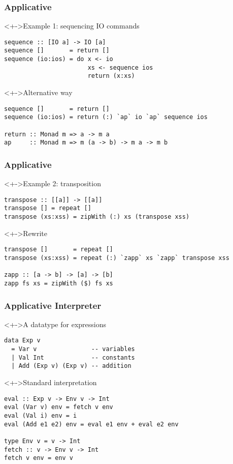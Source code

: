 \documentclass{beamer}
\begin{document}
\begin{frame}[fragile]
  \frametitle{Applicative}
  \begin{alertblock}<+->{Example 1: sequencing IO commands}
\begin{lstlisting}
sequence :: [IO a] -> IO [a]
sequence []       = return []
sequence (io:ios) = do x <- io
                       xs <- sequence ios
                       return (x:xs)
\end{lstlisting}  
  \end{alertblock}
  \begin{alertblock}<+->{Alternative way}
\begin{lstlisting}
sequence []       = return []
sequence (io:ios) = return (:) `ap` io `ap` sequence ios

return :: Monad m => a -> m a
ap     :: Monad m => m (a -> b) -> m a -> m b
\end{lstlisting}
  \end{alertblock}
\end{frame}

\begin{frame}[fragile]
 \frametitle{Applicative}
 \begin{exampleblock}<+->{Example 2: transposition}
\begin{lstlisting}
transpose :: [[a]] -> [[a]]
transpose [] = repeat []
transpose (xs:xss) = zipWith (:) xs (transpose xss)
\end{lstlisting}
 \end{exampleblock}
 \begin{alertblock}<+->{Rewrite}
\begin{lstlisting}
transpose []       = repeat []
transpose (xs:xss) = repeat (:) `zapp` xs `zapp` transpose xss

zapp :: [a -> b] -> [a] -> [b]
zapp fs xs = zipWith ($) fs xs
\end{lstlisting}
 \end{alertblock}
\end{frame}             

\begin{frame}[fragile]
  \frametitle{Applicative Interpreter}
  \begin{block}<+->{A datatype for expressions}
\begin{lstlisting}
data Exp v
  = Var v               -- variables
  | Val Int             -- constants
  | Add (Exp v) (Exp v) -- addition
\end{lstlisting}
  \end{block}
  \begin{exampleblock}<+->{Standard interpretation}
\begin{lstlisting}
eval :: Exp v -> Env v -> Int
eval (Var v) env = fetch v env
eval (Val i) env = i
eval (Add e1 e2) env = eval e1 env + eval e2 env

type Env v = v -> Int
fetch :: v -> Env v -> Int
fetch v env = env v
\end{lstlisting} 
\end{exampleblock}
\end{frame}
\end{document}
